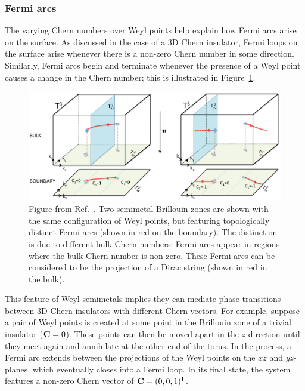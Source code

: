 \subsubsection{Fermi arcs}

The varying Chern numbers over Weyl points help explain how Fermi arcs arise on the surface. As discussed in the case of a 3D Chern insulator, Fermi loops on the surface arise whenever there is a non-zero Chern number in some direction. Similarly, Fermi arcs begin and terminate whenever the presence of a Weyl point causes a change in the Chern number; this is illustrated in Figure~\ref{fig:Fermi-arc-Chern}.
\begin{figure}[htb!]
	\centering
	\includegraphics[width=\linewidth]{Images/Fermi-arc-Chern}
	\caption{Figure from Ref.~\cite{Mathai_math-review}. Two semimetal Brillouin zones are shown with the same configuration of Weyl points, but featuring topologically distinct Fermi arcs (shown in red on the boundary). The distinction is due to different bulk Chern numbers: Fermi arcs appear in regions where the bulk Chern number is non-zero. These Fermi arcs can be considered to be the projection of a Dirac string (shown in red in the bulk).}
	\label{fig:Fermi-arc-Chern}
\end{figure}

This feature of Weyl semimetals implies they can mediate phase transitions between 3D Chern insulators with different Chern vectors. For example, suppose a pair of Weyl points is created at some point in the Brillouin zone of a trivial insulator ($\vb{C}=0$). These points can then be moved apart in the $z$ direction until they meet again and annihilate at the other end of the torus. In the process, a Fermi arc extends between the projections of the Weyl points on the $xz$ and $yz$-planes, which eventually closes into a Fermi loop. In its final state, the system features a non-zero Chern vector of $\vb{C} = (0,0,1)^{\mkern-1.5mu\mathsf{T}}$.

